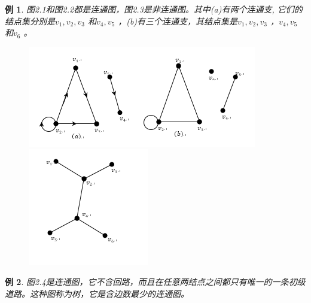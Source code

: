 \documentclass[11pt,a4paper,openany]{book}
\newtheorem{sample}{\textbf{例}}[section]
\begin{document}
\begin{sample}
图2.1和图2.2都是连通图，图2.3是非连通图。其中(a)有两个连通支, 它们的结点集分别是{$v_1,v_2,v_3$ }和{$v_4,v_5$ }，(b)有三个连通支，其结点集是{$v_1,v_2,v_3$ }，{$v_4,v_5$ } 和{$v_6$ }。
\end{sample}
\begin{figure}
  \centering
  \begin{minipage}[!ht]{.5\linewidth}
  \includegraphics[width=1.0\linewidth]{2.3.png}
  \caption{}
  \end{minipage}
  \begin{minipage}[!ht]{.35\linewidth}
   \includegraphics[width=1.0\linewidth]{2.4.png}
  \caption{}
  \end{minipage}
\end{figure}
\begin{sample}
图2.4是连通图，它不含回路，而且在任意两结点之间都只有唯一的一条初级道路。这种图称为树，它是含边数最少的连通图。
\end{sample}
\end{document}
